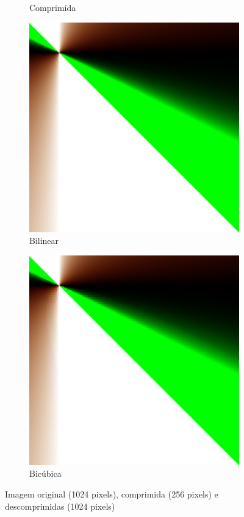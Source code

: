 \documentclass{article}
\begin{document}
\begin{figure}[ht]
\begin{subfigure}{0.23\textwidth}
    \caption{Comprimida}
  \end{subfigure}%
  \hfill
  \begin{subfigure}{0.23\textwidth}
    \centering
    \includegraphics[width=\textwidth]{polinomial/h-10/decompressed-bilinear.png}
    \caption{Bilinear}
  \end{subfigure}%
  \hfill
  \begin{subfigure}{0.23\textwidth}
    \centering
    \includegraphics[width=\textwidth]{polinomial/h-10/decompressed-bicubica.png}
    \caption{Bicúbica}
  \end{subfigure}
  \caption{Imagem original (1024 pixels), comprimida (256 pixels) e descomprimidas (1024 pixels)}
\end{figure}
\end{document}
